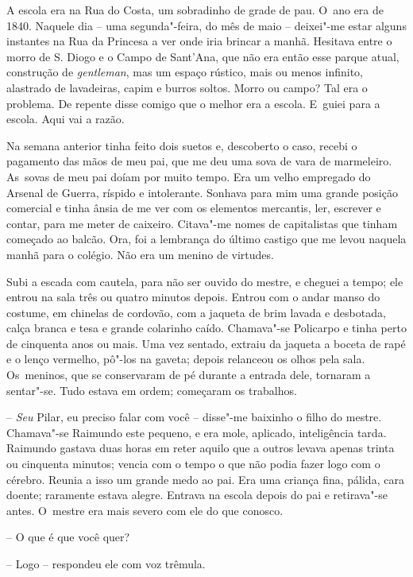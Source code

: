 A escola era na Rua do Costa, um sobradinho de grade de pau. O~ano era
de 1840. Naquele dia -- uma segunda"-feira, do mês de maio -- deixei"-me
estar alguns instantes na Rua da Princesa a ver onde iria brincar a
manhã. Hesitava entre o morro de S. Diogo e o Campo de Sant'Ana, que não
era então esse parque atual, construção de \emph{gentleman}, mas um
espaço rústico, mais ou menos infinito, alastrado de lavadeiras, capim e
burros soltos. Morro ou campo? Tal era o problema. De repente disse
comigo que o melhor era a escola. E~guiei para a escola. Aqui vai a
razão.

Na semana anterior tinha feito dois suetos e, descoberto o caso, recebi
o pagamento das mãos de meu pai, que me deu uma sova de vara de
marmeleiro. As~sovas de meu pai doíam por muito tempo. Era um velho
empregado do Arsenal de Guerra, ríspido e intolerante. Sonhava para mim
uma grande posição comercial e tinha ânsia de me ver com os elementos
mercantis, ler, escrever e contar, para me meter de caixeiro. Citava"-me
nomes de capitalistas que tinham começado ao balcão. Ora, foi a
lembrança do último castigo que me levou naquela manhã para o colégio.
Não era um menino de virtudes.

Subi a escada com cautela, para não ser ouvido do mestre, e cheguei a
tempo; ele entrou na sala três ou quatro minutos depois. Entrou com o
andar manso do costume, em chinelas de cordovão, com a jaqueta de brim
lavada e desbotada, calça branca e tesa e grande colarinho caído.
Chamava"-se Policarpo e tinha perto de cinquenta anos ou mais. Uma vez
sentado, extraiu da jaqueta a boceta de rapé e o lenço vermelho, pô"-los
na gaveta; depois relanceou os olhos pela sala. Os~meninos, que se
conservaram de pé durante a entrada dele, tornaram a sentar"-se. Tudo
estava em ordem; começaram os trabalhos.

-- \emph{Seu} Pilar, eu preciso falar com você -- disse"-me baixinho o
filho do mestre. Chamava"-se Raimundo este pequeno, e era mole, aplicado,
inteligência tarda. Raimundo gastava duas horas em reter aquilo que a
outros levava apenas trinta ou cinquenta minutos; vencia com o tempo o
que não podia fazer logo com o cérebro. Reunia a isso um grande medo ao
pai. Era uma criança fina, pálida, cara doente; raramente estava alegre.
Entrava na escola depois do pai e retirava"-se antes. O~mestre era mais
severo com ele do que conosco.

-- O que é que você quer?

-- Logo -- respondeu ele com voz trêmula.

